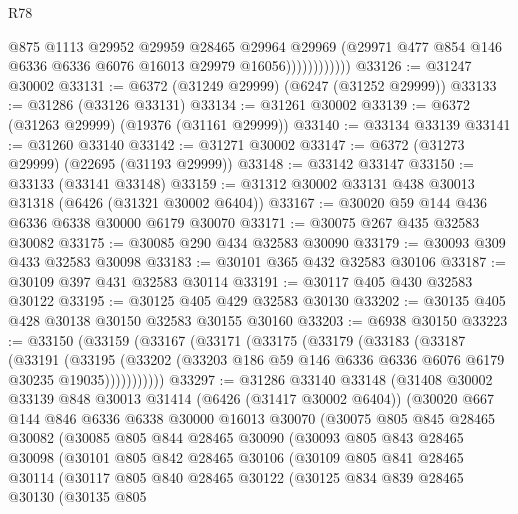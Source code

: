 \begin{lexlean}{R78}
\begin{coremodule}
                          @875
                          @1113
                          @29952
                          @29959
                          @28465
                          @29964
                          @29969
                          (@29971 @477 @854 @146 @6336 @6336 @6076 @16013 @29979 @16056))))))))))))
@33126 := @31247 @30002
@33131 := @6372 (@31249 @29999) (@6247 (@31252 @29999))
@33133 := @31286 (@33126 @33131)
@33134 := @31261 @30002
@33139 := @6372 (@31263 @29999) (@19376 (@31161 @29999))
@33140 := @33134 @33139
@33141 := @31260 @33140
@33142 := @31271 @30002
@33147 := @6372 (@31273 @29999) (@22695 (@31193 @29999))
@33148 := @33142 @33147
@33150 := @33133 (@33141 @33148)
@33159 := @31312 @30002 @33131 @438 @30013 @31318 (@6426 (@31321 @30002 @6404))
@33167 := @30020 @59 @144 @436 @6336 @6338 @30000 @6179 @30070
@33171 := @30075 @267 @435 @32583 @30082
@33175 := @30085 @290 @434 @32583 @30090
@33179 := @30093 @309 @433 @32583 @30098
@33183 := @30101 @365 @432 @32583 @30106
@33187 := @30109 @397 @431 @32583 @30114
@33191 := @30117 @405 @430 @32583 @30122
@33195 := @30125 @405 @429 @32583 @30130
@33202 := @30135 @405 @428 @30138 @30150 @32583 @30155 @30160
@33203 := @6938 @30150
@33223 := @33150
    (@33159
      (@33167
        (@33171
          (@33175
            (@33179
              (@33183
                (@33187
                  (@33191
                    (@33195
                      (@33202 (@33203 @186 @59 @146 @6336 @6336 @6076 @6179 @30235 @19035)))))))))))
@33297 := @31286
    @33140
    @33148
    (@31408
      @30002
      @33139
      @848
      @30013
      @31414
      (@6426 (@31417 @30002 @6404))
      (@30020
        @667
        @144
        @846
        @6336
        @6338
        @30000
        @16013
        @30070
        (@30075
          @805
          @845
          @28465
          @30082
          (@30085
            @805
            @844
            @28465
            @30090
            (@30093
              @805
              @843
              @28465
              @30098
              (@30101
                @805
                @842
                @28465
                @30106
                (@30109
                  @805
                  @841
                  @28465
                  @30114
                  (@30117
                    @805
                    @840
                    @28465
                    @30122
                    (@30125
                      @834
                      @839
                      @28465
                      @30130
                      (@30135
                        @805

\end{coremodule}
\end{lexlean}
